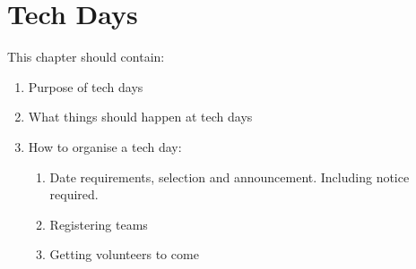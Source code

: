 \chapter{Tech Days}

This chapter should contain:
\begin{enumerate}
\item Purpose of tech days
\item What things should happen at tech days
\item How to organise a tech day:
  \begin{enumerate}
  \item Date requirements, selection and announcement.  Including notice required.
  \item Registering teams
  \item Getting volunteers to come
  \end{enumerate}
\end{enumerate}
